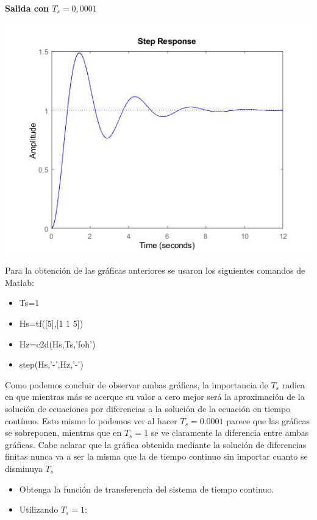 \noindent \textbf{Salida con $T_s=0,0001$}

\noindent \includegraphics[scale=0.6]{./img2/SalidaTs00001}

Para la obtención de las gráficas anteriores se usaron los siguientes comandos de Matlab:

\begin{itemize}
\item Ts=1
\item Hs=tf([5],[1 1 5])
\item Hz=c2d(Hs,Ts,'foh')
\item step(Hs,'-',Hz,'-')
\end{itemize}


Como podemos concluir de observar ambas gráficas, la importancia de $T_s$ radica en que mientras más se acerque su valor a cero mejor será la aproximación de la solución de ecuaciones por diferencias a la solución de la ecuación en tiempo contínuo. Esto mismo lo podemos ver al hacer $T_s=0.0001$ parece que las gráficas se sobreponen, mientras que en $T_s=1$ se ve claramente la diferencia entre ambas gráficas. Cabe aclarar que la gráfica obtenida mediante la solución de diferencias finitas nunca va a ser la misma que la de tiempo continuo sin importar cuanto se disminuya $T_s$

\begin{itemize}
	\item Obtenga la función de transferencia del sistema de tiempo continuo.
	\item Utilizando $ T_s = 1 $:
\end{itemize}


